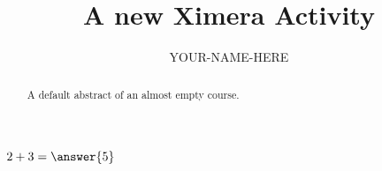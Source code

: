 \documentclass{ximera}
\title{A new Ximera Activity}
\author{YOUR-NAME-HERE}
\begin{document}
\begin{abstract}
    A default abstract of an almost empty course.
\end{abstract}
\maketitle


\begin{exercise}
    $2+3=\answer{5}$
\end{exercise}

\end{document}
